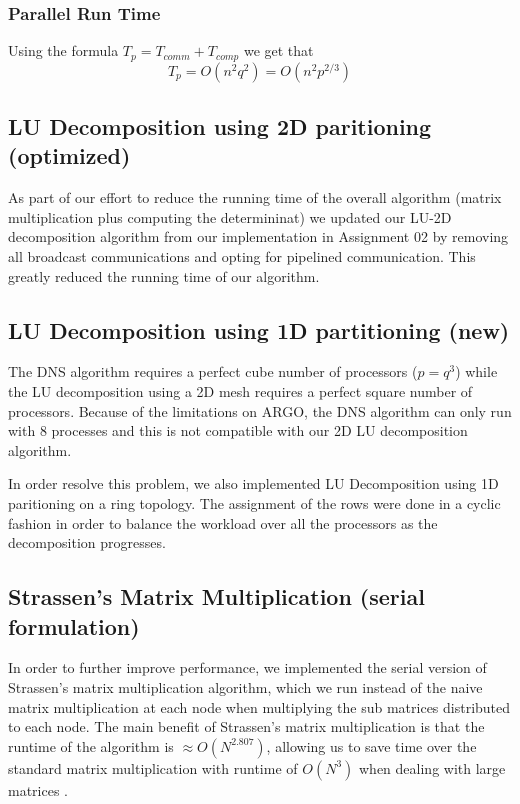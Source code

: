 \documentclass{article}
\begin{document}
\subsubsection{Parallel Run Time}

Using the formula $T_p = T_{{comm}} + T_{{comp}}$ we get that $$T_p = O(n^2
q^2) = O(n^2 p^{2/3})$$

\subsection{LU Decomposition using 2D paritioning (optimized)}

As part of our effort to reduce the running time of the overall algorithm
(matrix multiplication plus computing the determininat) we updated our LU-2D
decomposition algorithm from our implementation in Assignment 02 by removing all
broadcast communications and opting for pipelined communication.  This greatly
reduced the running time of our algorithm.

\subsection{LU Decomposition using 1D partitioning (new)}


The DNS algorithm requires a perfect cube number of processors ($p = q^3$) while
the LU decomposition using a 2D mesh requires a perfect square number of
processors.  Because of the limitations on ARGO, the DNS algorithm can only run
with 8 processes and this is not compatible with our 2D LU decomposition
algorithm.

In order resolve this problem, we also implemented LU Decomposition using 1D
paritioning on a ring topology.  The assignment of the rows were done in a
cyclic fashion in order to balance the workload over all the processors as the
decomposition progresses.

\subsection{Strassen's Matrix Multiplication (serial formulation)}

In order to further improve performance, we implemented the serial version of
Strassen's matrix multiplication algorithm, which we run instead of the naive
matrix multiplication at each node when multiplying the sub matrices distributed
to each node.  The main benefit of Strassen's matrix multiplication is that the
runtime of the algorithm is $\approx O(N^{2.807})$, allowing us to save time
over the standard matrix multiplication with runtime of $O(N^3)$ when dealing
with large matrices .
\end{document}

